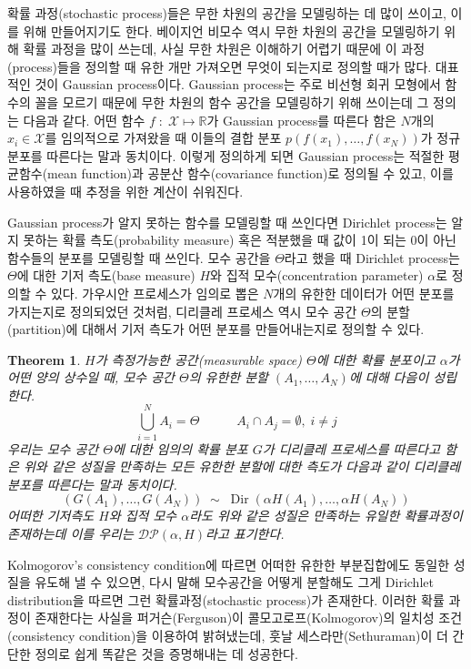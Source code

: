 \documentclass[a4paper, 10pt]{book}
\newtheorem{thm}{Theorem}[section]
\newcommand{\opn}{\operatorname}
\begin{document}
  확률 과정(stochastic process)들은 무한 차원의 공간을 모델링하는 데 많이 쓰이고, 이를 위해 만들어지기도 한다. 베이지언 비모수 역시 무한 차원의 공간을 모델링하기 위해 확률 과정을 많이 쓰는데, 사실 무한 차원은 이해하기 어렵기 때문에 이 과정(process)들을 정의할 때 유한 개만 가져오면 무엇이 되는지로 정의할 때가 많다. 대표적인 것이 Gaussian process이다. Gaussian process는 주로 비선형 회귀 모형에서 함수의 꼴을 모르기 때문에 무한 차원의 함수 공간을 모델링하기 위해 쓰이는데 그 정의는 다음과 같다. 어떤 함수 $f\; : \; \mathcal{X}\mapsto \mathbb{R}$가 Gaussian process를 따른다 함은 $N$개의 $x_{i}\in \mathcal{X}$를 임의적으로 가져왔을 때 이들의 결합 분포 $p\left(f\left(x_{1}\right),\ldots ,f\left(x_{N}\right)\right)$가 정규분포를 따른다는 말과 동치이다. 이렇게 정의하게 되면 Gaussian process는 적절한 평균함수(mean function)과 공분산 함수(covariance function)로 정의될 수 있고, 이를 사용하였을 때 추정을 위한 계산이 쉬워진다. \par
  Gaussian process가 알지 못하는 함수를 모델링할 때 쓰인다면 Dirichlet process는 알지 못하는 확률 측도(probability measure) 혹은 적분했을 때 값이 1이 되는 0이 아닌 함수들의 분포를 모델링할 때 쓰인다. 모수 공간을 $\Theta$라고 했을 때 Dirichlet process는 $\Theta$에 대한 기저 측도(base measure) $H$와 집적 모수(concentration parameter) $\alpha$로 정의할 수 있다. 가우시안 프로세스가 임의로 뽑은 $N$개의 유한한 데이터가 어떤 분포를 가지는지로 정의되었던 것처럼, 디리클레 프로세스 역시 모수 공간 $\Theta$의 분할(partition)에 대해서 기저 측도가 어떤 분포를 만들어내는지로 정의할 수 있다.
  \begin{thm}
    $H$가 측정가능한 공간(measurable space) $\Theta$에 대한 확률 분포이고 $\alpha$가 어떤 양의 상수일 때, 모수 공간 $\Theta$의 유한한 분할 $\left(A_{1},\ldots , A_{N}\right)$에 대해 다음이 성립한다.
    $$
      \bigcup_{i=1}^{N}A_{i} = \Theta \hspace{35pt} A_{i}\cap A_{j} = \emptyset,\; i \neq j
    $$
    우리는 모수 공간 $\Theta$에 대한 임의의 확률 분포 $G$가 디리클레 프로세스를 따른다고 함은 위와 같은 성질을 만족하는 모든 유한한 분할에 대한 측도가 다음과 같이 디리클레 분포를 따른다는 말과 동치이다.
    $$
      \left(G\left(A_{1}\right),\ldots ,G\left(A_{N}\right)\right) \;\sim\; \opn{Dir}\left(\alpha H\left(A_{1}\right),\ldots , \alpha H\left(A_{N}\right)\right)
    $$
    어떠한 기저측도 $H$와 집적 모수 $\alpha$라도 위와 같은 성질은 만족하는 유일한 확률과정이 존재하는데 이를 우리는 $\mathcal{DP}\left(\alpha, H\right)$라고 표기한다.
  \end{thm}
  Kolmogorov's consistency condition에 따르면 어떠한 유한한 부분집합에도 동일한 성질을 유도해 낼 수 있으면, 다시 말해 모수공간을 어떻게 분할해도 그게 Dirichlet distribution을 따르면 그런 확률과정(stochastic process)가 존재한다. 이러한 확률 과정이 존재한다는 사실을 퍼거슨(Ferguson)이 콜모고로프(Kolmogorov)의 일치성 조건(consistency condition)을 이용하여 밝혀냈는데, 훗날 세스라만(Sethuraman)이 더 간단한 정의로 쉽게 똑같은 것을 증명해내는 데 성공한다.
\end{document}
